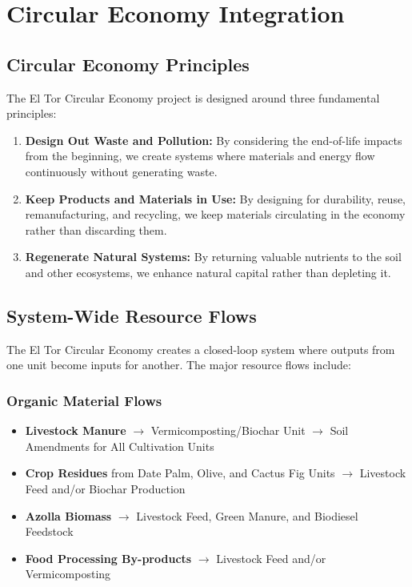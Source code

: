 \section{Circular Economy Integration}

\subsection{Circular Economy Principles}
The El Tor Circular Economy project is designed around three fundamental principles:

\begin{enumerate}
    \item \textbf{Design Out Waste and Pollution:} By considering the end-of-life impacts from the beginning, we create systems where materials and energy flow continuously without generating waste.
    
    \item \textbf{Keep Products and Materials in Use:} By designing for durability, reuse, remanufacturing, and recycling, we keep materials circulating in the economy rather than discarding them.
    
    \item \textbf{Regenerate Natural Systems:} By returning valuable nutrients to the soil and other ecosystems, we enhance natural capital rather than depleting it.
\end{enumerate}

\subsection{System-Wide Resource Flows}

The El Tor Circular Economy creates a closed-loop system where outputs from one unit become inputs for another. The major resource flows include:

\subsubsection{Organic Material Flows}
\begin{itemize}
    \item \textbf{Livestock Manure} $\rightarrow$ Vermicomposting/Biochar Unit $\rightarrow$ Soil Amendments for All Cultivation Units
    \item \textbf{Crop Residues} from Date Palm, Olive, and Cactus Fig Units $\rightarrow$ Livestock Feed and/or Biochar Production
    \item \textbf{Azolla Biomass} $\rightarrow$ Livestock Feed, Green Manure, and Biodiesel Feedstock
    \item \textbf{Food Processing By-products} $\rightarrow$ Livestock Feed and/or Vermicomposting
\end{itemize}

